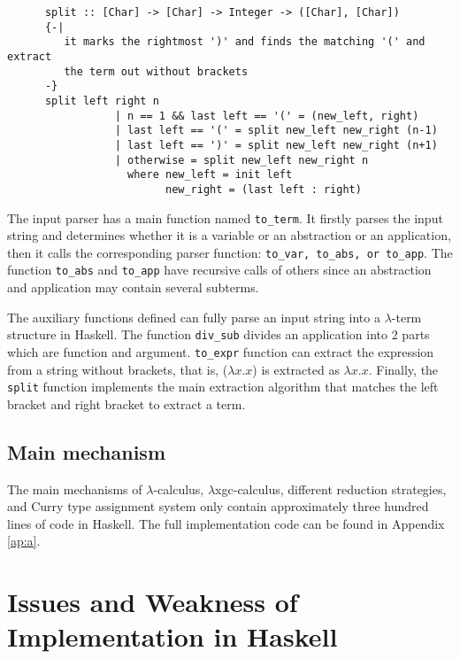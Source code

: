 \begin{verbatim}
      split :: [Char] -> [Char] -> Integer -> ([Char], [Char])
      {-|
         it marks the rightmost ')' and finds the matching '(' and extract 
         the term out without brackets
      -}
      split left right n
                 | n == 1 && last left == '(' = (new_left, right)
                 | last left == '(' = split new_left new_right (n-1)
                 | last left == ')' = split new_left new_right (n+1)
                 | otherwise = split new_left new_right n
                   where new_left = init left 
                         new_right = (last left : right)
\end{verbatim}

The input parser has a main function named \verb|to_term|. It firstly parses the input string and determines whether it is a variable or an abstraction or an application, then it calls the corresponding parser function: \verb|to_var, to_abs, or to_app|. The function \verb|to_abs| and \verb|to_app| have recursive calls of others since an abstraction and application may contain several subterms.   

The auxiliary functions defined can fully parse an input string into a $\lambda$-term structure in Haskell. The function \verb|div_sub| divides an application into 2 parts which are function and argument. \verb|to_expr| function can extract the expression from a string without brackets, that is, ($\lambda x.x$) is extracted as $\lambda x.x$.
Finally, the \verb|split| function implements the main extraction algorithm that matches the left bracket and right bracket to extract a term.


\subsection{Main mechanism}
The main mechanisms of $\lambda$-calculus, $\lambda$xgc-calculus, different reduction strategies, and Curry type assignment system only contain approximately three hundred lines of code in Haskell. The full implementation code can be found in Appendix \ref{ap:a}.   


\section{Issues and Weakness of Implementation in Haskell }

